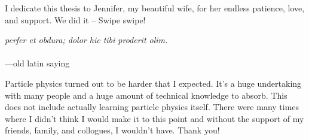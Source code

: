 \begin{frontmatter}
\makefrontmatter                                                               


\begin{dedication}                                                             
  I dedicate this thesis to Jennifer, my beautiful wife, for her endless patience, love, and support.  We did it -- Swipe swipe!
\end{dedication}                                                               
\clearpage 


\begin{myepigraph} %
  \vfil                                                                        
  \vfil 
  \hfill {\it perfer et obdura; dolor hic tibi proderit olim.} \\
  \vfil 
   \hfill \\
  \vfil 
  \hfill ---old latin saying
  \vfil 
\end{myepigraph}                                                               

\tableofcontents
\listoffigures  %
\listoftables   %

\begin{acknowledgements}                                                       
Particle physics turned out to be harder that I expected. It's a huge
undertaking with many people and a huge amount of technical
knowledge to absorb. This does not include actually learning particle physics
itself. There were many times where I didn't think I would make it to this
point and without the support of my friends, family, and collogues, I wouldn't
have. Thank you!


\end{acknowledgements}
\end{frontmatter}
